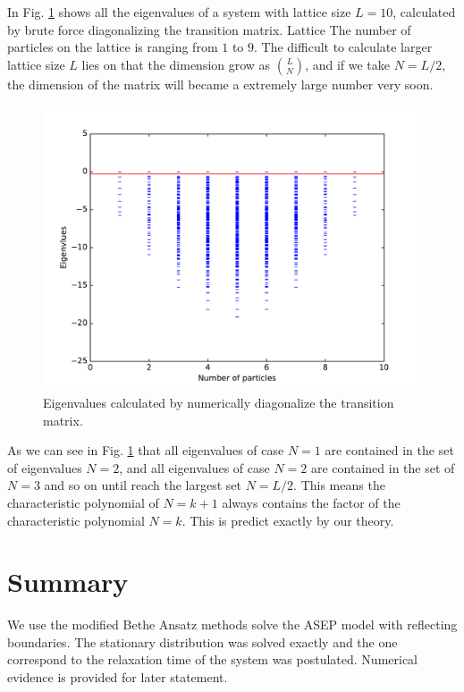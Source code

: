 \documentclass[12pt,a4paper]{article}
\begin{document}
In Fig.  \ref{fig:eigenvalues} shows all the eigenvalues of a system with
lattice size $L=10$, calculated by brute force diagonalizing the transition
matrix.  Lattice The number of particles on the lattice is ranging from $1$ to
$9$. The difficult to calculate larger lattice size $L$ lies on that the
dimension grow as $\binom{L}{N}$, and if we take $N=L/2$, the dimension of the
matrix will became a extremely large number very soon. 

\begin{figure}[htpb]
    \centering
    \includegraphics[width=0.8\linewidth]{eigenvalues}
    \caption{Eigenvalues calculated by numerically diagonalize the transition
        matrix.}
    \label{fig:eigenvalues}
\end{figure}

As we can see in Fig. \ref{fig:eigenvalues}
that all eigenvalues of case $N=1$ are contained in the set of
eigenvalues $N=2$, and all eigenvalues of case $N=2$ are contained in the set
of $N=3$ and so on until reach the largest set $N=L/2$. This means the
characteristic polynomial of $N=k+1$ always contains the factor of the
characteristic polynomial $N=k$. This is predict exactly by our theory. 

\section{Summary}
\label{sec:summeary}
We use the modified Bethe Ansatz methods solve the ASEP model with reflecting
boundaries.  The stationary distribution was solved exactly and the one
correspond to the relaxation time of the system was postulated. Numerical
evidence is provided for later statement.


% 
 
\end{document}
